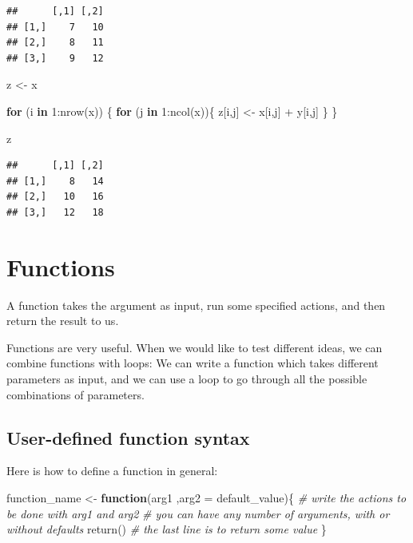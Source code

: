 \documentclass[
  11pt,
]{book}
\newenvironment{Shaded}{\begin{snugshade}}{\end{snugshade}}
\newcommand{\AttributeTok}[1]{\textcolor[rgb]{0.77,0.63,0.00}{#1}}
\newcommand{\CommentTok}[1]{\textcolor[rgb]{0.56,0.35,0.01}{\textit{#1}}}
\newcommand{\ControlFlowTok}[1]{\textcolor[rgb]{0.13,0.29,0.53}{\textbf{#1}}}
\newcommand{\DecValTok}[1]{\textcolor[rgb]{0.00,0.00,0.81}{#1}}
\newcommand{\FunctionTok}[1]{\textcolor[rgb]{0.00,0.00,0.00}{#1}}
\newcommand{\NormalTok}[1]{#1}
\newcommand{\OtherTok}[1]{\textcolor[rgb]{0.56,0.35,0.01}{#1}}
\newcommand{\SpecialCharTok}[1]{\textcolor[rgb]{0.00,0.00,0.00}{#1}}
\begin{document}
\begin{verbatim}
##      [,1] [,2]
## [1,]    7   10
## [2,]    8   11
## [3,]    9   12
\end{verbatim}

\begin{Shaded}
\begin{Highlighting}[]
\NormalTok{z }\OtherTok{\textless{}{-}}\NormalTok{ x}

\ControlFlowTok{for}\NormalTok{ (i }\ControlFlowTok{in} \DecValTok{1}\SpecialCharTok{:}\FunctionTok{nrow}\NormalTok{(x)) \{}
  \ControlFlowTok{for}\NormalTok{ (j }\ControlFlowTok{in} \DecValTok{1}\SpecialCharTok{:}\FunctionTok{ncol}\NormalTok{(x))\{}
\NormalTok{    z[i,j] }\OtherTok{\textless{}{-}}\NormalTok{ x[i,j] }\SpecialCharTok{+}\NormalTok{ y[i,j]}
\NormalTok{  \}}
\NormalTok{\}}

\NormalTok{z}
\end{Highlighting}
\end{Shaded}

\begin{verbatim}
##      [,1] [,2]
## [1,]    8   14
## [2,]   10   16
## [3,]   12   18
\end{verbatim}

\hypertarget{functions}{%
\section{Functions}\label{functions}}

A function takes the argument as input, run some specified actions, and then return the result to us.

Functions are very useful. When we would like to test different ideas, we can combine functions with loops: We can write a function which takes different parameters as input, and we can use a loop to go through all the possible combinations of parameters.

\hypertarget{user-defined-function-syntax}{%
\subsection{User-defined function syntax}\label{user-defined-function-syntax}}

Here is how to define a function in general:

\begin{Shaded}
\begin{Highlighting}[]
\NormalTok{function\_name }\OtherTok{\textless{}{-}} \ControlFlowTok{function}\NormalTok{(arg1 ,}\AttributeTok{arg2 =}\NormalTok{ default\_value)\{}
  \CommentTok{\# write the actions to be done with arg1 and arg2}
  \CommentTok{\# you can have any number of arguments, with or without defaults}
  \FunctionTok{return}\NormalTok{() }\CommentTok{\# the last line is to return some value }
\NormalTok{\}}
\end{Highlighting}
\end{Shaded}
\end{document}
